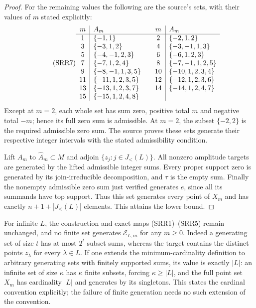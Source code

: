 \begin{proof}
For the remaining values the following are the source's sets,
with their values of $m$ stated explicitly:
\begin{equation}\tag{SRR7}
\begin{array}{c|l@{\qquad}c|l}
m&A_m&m&A_m\\\hline
1&\{-1,1\}&2&\{-2,1,2\}\\
3&\{-3,1,2\}&4&\{-3,-1,1,3\}\\
5&\{-4,-1,2,3\}&6&\{-6,1,2,3\}\\
7&\{-7,1,2,4\}&8&\{-7,-1,1,2,5\}\\
9&\{-8,-1,1,3,5\}&10&\{-10,1,2,3,4\}\\
11&\{-11,1,2,3,5\}&12&\{-12,1,2,3,6\}\\
13&\{-13,1,2,3,7\}&14&\{-14,1,2,4,7\}\\
15&\{-15,1,2,4,8\}&&
\end{array}
\end{equation}
Except at $m=2$, each whole set has sum zero, positive total $m$
and negative total $-m$; hence its full zero sum is admissible.
At $m=2$, the subset $\{-2,2\}$ is the required admissible
zero sum. The source proves these sets generate their respective
integer intervals with the stated admissibility condition.

Lift $A_m$ to $\widehat A_m\subset M$ and adjoin
$\{z_j:j\in J_{<}(L)\}$. All nonzero amplitude targets are
generated by the lifted admissible integer sums. Every proper
support zero is generated by its join-irreducible decomposition,
and $\tau$ is the empty sum. Finally the nonempty admissible
zero sum just verified generates $e$, since all its summands have
top support. Thus this set generates every point of $X_m$ and has
exactly $n+1+|J_{<}(L)|$ elements. This attains the lower bound.
\end{proof}

For infinite $L$, the construction and exact maps (SRR1)--(SRR5)
remain unchanged, and no finite set generates
$\mathcal E_{L,m}$ for any $m\ge0$. Indeed a generating set of
size $t$ has at most $2^t$ subset sums, whereas the target contains
the distinct points $z_\lambda$ for every $\lambda\in L$.
If one extends the minimum-cardinality definition to arbitrary
generating sets with finitely supported sums, its value is exactly
$|L|$: an infinite set of size $\kappa$ has $\kappa$ finite
subsets, forcing $\kappa\ge|L|$, and the full point set $X_m$
has cardinality $|L|$ and generates by its singletons. This states
the cardinal convention explicitly; the failure of finite generation
needs no such extension of the convention.

